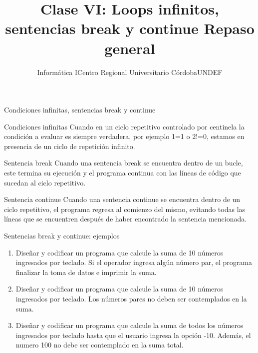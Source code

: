 \documentclass[xcolor=pdftex,table,11pt]{beamer}
\author{Informática I\newline Centro Regional Universitario Córdoba\newline UNDEF }
\title{Clase VI: \newline Loops infinitos, sentencias break y continue \newline Repaso general }
\begin{document}
\begin{frame}
\titlepage
\end{frame}


\begin{frame}{Condiciones infinitas, sentencias break y continue}

\begin{block}{Condiciones infinitas}
Cuando en un ciclo repetitivo controlado por centinela la condición a evaluar es siempre verdadera, por ejemplo 1=1 o  2!=0, estamos en presencia de un ciclo de repetición infinito.
\end{block}

\begin{block}{Sentencia break}
Cuando una sentencia break se encuentra dentro de un bucle, este termina su ejecución y el programa continua con las líneas de código que sucedan al ciclo repetitivo.
\end{block}

\begin{block}{Sentencia continue}
Cuando una sentencia continue se encuentra dentro de un ciclo repetitivo, el programa regresa al comienzo del mismo, evitando todas las líneas que se encuentren después de haber encontrado la sentencia mencionada. 
\end{block}

\end{frame}


\begin{frame}{Sentencias break y continue: ejemplos}
 \begin{enumerate}
   
     \item Diseñar y codificar un programa que calcule la suma de 10 números ingresados por teclado. Si el operador ingresa algún número par, el programa finalizar la toma de datos e imprimir la suma. \\
\href{https://github.com/danis963/informaticaI_IUA/blob/main/c/src/5-break_cont_1.c}{}

\item Diseñar y codificar un programa que calcule la suma de 10 números ingresados por teclado. Los números pares no deben ser contemplados en la suma.\\
\href{https://github.com/danis963/informaticaI_IUA/blob/main/c/src/5-break_cont_2.c}{}

\item Diseñar y codificar un programa que calcule la suma de todos los números ingresados por teclado hasta que el usuario ingresa la opción -10. Además, el numero 100 no debe ser contemplado en la suma total.
\href{https://github.com/danis963/informaticaI_IUA/blob/main/c/src/5-break_cont_3.c}{}

   \end{enumerate}
\end{frame}
\end{document}
